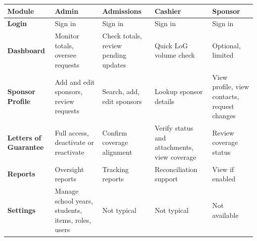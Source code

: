         \begin{center}
        \captionsetup{type=table}
        \caption{Role Functions}
        \label{table:role-functions}
        \smalltable
        \scriptsize
        \begin{tabular}{|>{\raggedright\arraybackslash}p{2.6cm}|
                        >{\raggedright\arraybackslash}p{2.0cm}|
                        >{\raggedright\arraybackslash}p{2.6cm}|
                        >{\raggedright\arraybackslash}p{2.6cm}|
                        >{\raggedright\arraybackslash}p{2.6cm}|}
        \hline
        \textbf{Module} &
        \textbf{Admin} &
        \textbf{Admissions} &
        \textbf{Cashier} &
        \textbf{Sponsor} \\
        \hline\hline
        
        \textbf{Login} &
        Sign in &
        Sign in &
        Sign in &
        Sign in \\
        \hline
        
        \textbf{Dashboard} &
        Monitor totals, oversee requests &
        Check totals, review pending updates &
        Quick LoG volume check &
        Optional, limited \\
        \hline
        
        \textbf{Sponsor Profile} &
        Add and edit sponsors, review requests &
        Search, add, edit sponsors &
        Lookup sponsor details &
        View profile, view contacts, request changes \\
        \hline
        
        \textbf{Letters of Guarantee} &
        Full access, deactivate or reactivate &
        Confirm coverage alignment &
        Verify status and attachments, view coverage &
        Review coverage status \\
        \hline
        
        \textbf{Reports} &
        Oversight reports &
        Tracking reports &
        Reconciliation support &
        View if enabled \\
        \hline
        
        \textbf{Settings} &
        Manage school years, students, items, roles, users &
        Not typical &
        Not typical &
        Not available \\
        \hline
        
        \end{tabular}
        \end{center}
        
